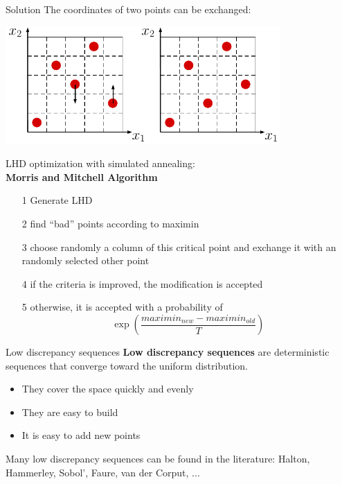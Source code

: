 \documentclass{beamer}
\begin{document}
\begin{frame}{}
\begin{exampleblock}{Solution}
The coordinates of two points can be exchanged:\\
\vspace{4mm}
\begin{center}
\includegraphics[height=4.5cm]{figures/latexdraw/lhs3}
\end{center}
\end{exampleblock}
\end{frame}

\begin{frame}{}
LHD optimization with simulated annealing:\\
\vspace{4mm}
\textbf{Morris and Mitchell Algorithm}\\
\vspace{2mm}
\begin{itemize}
	\item[1] Generate LHD
	\item[2] find ``bad'' points according to maximin
	\item[3] choose randomly a column of this critical point and exchange it with an randomly selected other point
	\item[4] \qquad if the criteria is improved, the modification is accepted
	\item[5] \qquad otherwise, it is accepted with a probability of $$\exp \left(\frac{maximin_{new}-maximin_{old}}{T}\right)$$
	\end{itemize}
\end{frame}



\begin{frame}{Low discrepancy sequences}
\textbf{Low discrepancy sequences} are deterministic sequences that converge toward the uniform distribution.
\begin{itemize}
	\item They cover the space quickly and evenly
	\item They are easy to build
	\item It is easy to add new points
\end{itemize}
\vspace{5mm}
Many low discrepancy sequences can be found in the literature: Halton, Hammerley, Sobol', Faure, van der Corput, ...
\end{frame}
\end{document}
